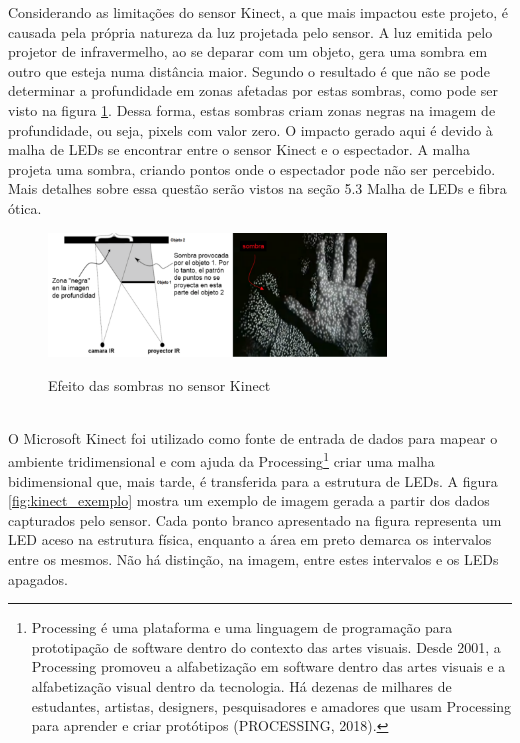 Considerando as limitações do sensor Kinect, a que mais impactou este projeto, é causada pela própria natureza da luz projetada pelo sensor. A luz emitida pelo projetor de infravermelho, ao se deparar com um objeto, gera uma sombra em outro que esteja numa distância maior. Segundo  o resultado é que não se pode determinar a profundidade em zonas afetadas por estas sombras, como pode ser visto na figura \ref{fig:kinect_sombras}. Dessa forma, estas sombras criam zonas negras na imagem de profundidade, ou seja, pixels com valor zero. O impacto gerado aqui é devido à malha de LEDs se encontrar entre o sensor Kinect e o espectador. A malha projeta uma sombra, criando pontos onde o espectador pode não ser percebido.  Mais detalhes sobre essa questão serão vistos na seção 5.3 Malha de LEDs e fibra ótica.

\begin{figure}[H]
    \centering
    \caption{Efeito das sombras no sensor Kinect}
	\vspace*{0,2cm}
    \includegraphics[width=0.8\textwidth]{./04-figuras/kinect_sombras}
    \label{fig:kinect_sombras}
\end{figure}
\vspace*{-0,9cm}
{\raggedright {}}\\


O Microsoft Kinect foi utilizado como fonte de entrada de dados para mapear o ambiente tridimensional e com ajuda da Processing\footnote{Processing é uma plataforma e uma linguagem de programação para prototipação de software dentro do contexto das artes visuais. Desde 2001, a Processing promoveu a alfabetização em software dentro das artes visuais e a alfabetização visual dentro da tecnologia. Há dezenas de milhares de estudantes, artistas, designers, pesquisadores e amadores que usam Processing para aprender e criar protótipos (PROCESSING, 2018).} criar uma malha bidimensional que, mais tarde, é transferida para a estrutura de LEDs. A figura \ref{fig:kinect_exemplo} mostra um exemplo de imagem gerada a partir dos dados capturados pelo sensor. Cada ponto branco apresentado na figura representa um LED aceso na estrutura física, enquanto a área em preto demarca os intervalos entre os mesmos. Não há distinção, na imagem, entre estes intervalos e os LEDs apagados. 

